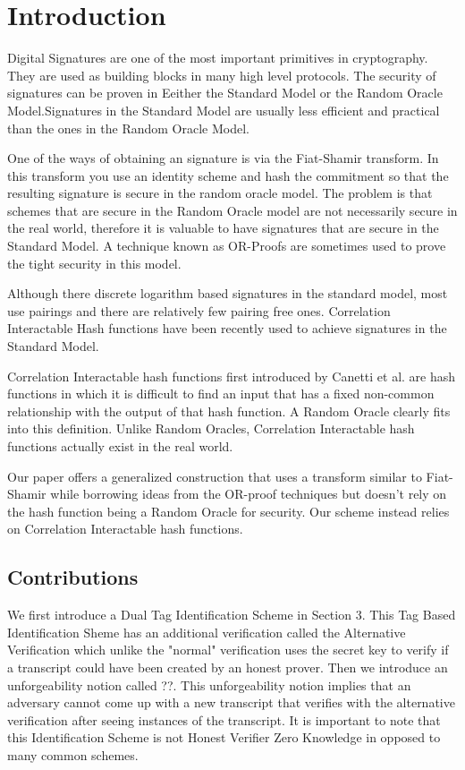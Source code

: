 \section{Introduction}\label{sec:intro}
	Digital Signatures are one of the most important primitives in cryptography. They are used as building blocks in many high level protocols. The security of signatures can be proven in Eeither the Standard Model or the Random Oracle Model.Signatures in the Standard Model are usually less efficient and practical than the ones in the Random Oracle Model.
	
	
	One of the ways of obtaining an signature is via the Fiat-Shamir transform. In this transform you use an identity scheme and hash the commitment so that the resulting signature is secure in the random oracle model. The problem is that schemes that are secure in the Random Oracle model are not necessarily secure in the real world, therefore it is valuable to have signatures that are secure in the Standard Model. A technique known as OR-Proofs are sometimes used to prove the tight security in this model.
	
	 Although there discrete logarithm based signatures in the standard model, most use pairings and there are relatively few pairing free ones. Correlation Interactable Hash functions have been recently used to achieve signatures in the Standard Model.
	 
	 Correlation Interactable hash functions first introduced by Canetti et al. are hash functions in which it is difficult to find an input that has a fixed non-common relationship with the output of that hash function. A Random Oracle clearly fits into this definition. Unlike Random Oracles, Correlation Interactable hash functions actually exist in the real world.
	 
	 
	 Our paper offers a generalized construction that uses a transform similar to Fiat-Shamir while borrowing ideas from the OR-proof techniques but doesn't rely on the hash function being a Random Oracle for security. Our scheme instead relies on Correlation Interactable hash functions.
	 
	 

	 
	 \subsection{Contributions}
	 
	 We first introduce a Dual Tag Identification Scheme in Section 3. This Tag Based Identification Sheme has an additional verification called the Alternative Verification which unlike the "normal" verification uses the secret key to verify if a transcript could have been created by an honest prover. Then we introduce an unforgeability notion called ??. This unforgeability notion implies that an adversary cannot come up with a new transcript that verifies with the alternative verification after seeing instances of the transcript. It is important to note that this Identification Scheme is not Honest Verifier Zero Knowledge in opposed to many common schemes.
	 
